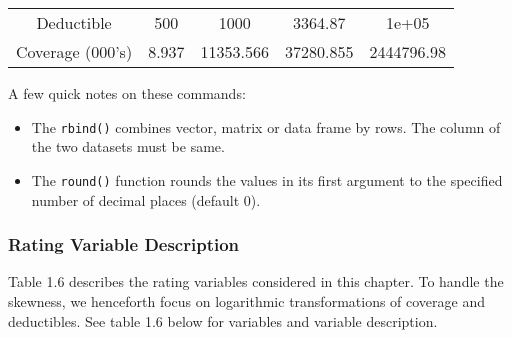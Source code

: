 \documentclass[]{book}
\theoremstyle{definition}
\theoremstyle{definition}
\theoremstyle{definition}
\theoremstyle{remark}
\begin{document}
\begin{longtable}[]{@{}ccccc@{}}
\begin{minipage}[t]{0.23\columnwidth}
Deductible\strut
\end{minipage} & \begin{minipage}[t]{0.12\columnwidth}\centering\strut
500\strut
\end{minipage} & \begin{minipage}[t]{0.14\columnwidth}\centering\strut
1000\strut
\end{minipage} & \begin{minipage}[t]{0.14\columnwidth}\centering\strut
3364.87\strut
\end{minipage} & \begin{minipage}[t]{0.16\columnwidth}\centering\strut
1e+05\strut
\end{minipage}\tabularnewline
\begin{minipage}[t]{0.23\columnwidth}\centering\strut
Coverage (000's)\strut
\end{minipage} & \begin{minipage}[t]{0.12\columnwidth}\centering\strut
8.937\strut
\end{minipage} & \begin{minipage}[t]{0.14\columnwidth}\centering\strut
11353.566\strut
\end{minipage} & \begin{minipage}[t]{0.14\columnwidth}\centering\strut
37280.855\strut
\end{minipage} & \begin{minipage}[t]{0.16\columnwidth}\centering\strut
2444796.98\strut
\end{minipage}\tabularnewline
\bottomrule
\end{longtable}

A few quick notes on these commands:

\begin{itemize}
\item
  The \texttt{rbind()} combines vector, matrix or data frame by rows.
  The column of the two datasets must be same.
\item
  The \texttt{round()} function rounds the values in its first argument
  to the specified number of decimal places (default 0).
\end{itemize}

\subsubsection{Rating Variable
Description}\label{rating-variable-description}

Table 1.6 describes the rating variables considered in this chapter. To
handle the skewness, we henceforth focus on logarithmic transformations
of coverage and deductibles. See table 1.6 below for variables and
variable description.
\end{document}
